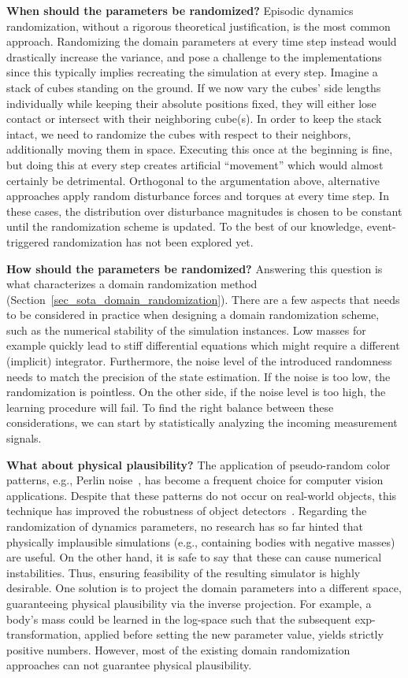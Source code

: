 \documentclass[utf8]{frontiersSCNS} %
\begin{document}
\textbf{When should the parameters be randomized?}
Episodic dynamics randomization, without a rigorous theoretical justification, is the most common approach.
Randomizing the domain parameters at every time step instead would drastically increase the variance, and pose a challenge to the implementations since this typically implies recreating the simulation at every step.
Imagine a stack of cubes standing on the ground.
If we now vary the cubes' side lengths individually while keeping their absolute positions fixed, they will either lose contact or intersect with their neighboring cube(s).
In order to keep the stack intact, we need to randomize the cubes with respect to their neighbors, additionally moving them in space.
Executing this once at the beginning is fine, but doing this at every step creates artificial \enquote{movement} which would almost certainly be detrimental.
Orthogonal to the argumentation above, alternative approaches apply random disturbance forces and torques at every time step.
In these cases, the distribution over disturbance magnitudes is chosen to be constant until the randomization scheme is updated. 
To the best of our knowledge, event-triggered randomization has not been explored yet.

\textbf{How should the parameters be randomized?}
Answering this question is what characterizes a domain randomization method (Section~\ref{sec_sota_domain_randomization}).
There are a few aspects that needs to be considered in practice when designing a domain randomization scheme, such as the numerical stability of the simulation instances.
Low masses for example quickly lead to stiff differential equations which might require a different (implicit) integrator.
Furthermore, the noise level of the introduced randomness needs to match the precision of the state estimation.
If the noise is too low, the randomization is pointless.
On the other side, if the noise level is too high, the learning procedure will fail.
To find the right balance between these considerations, we can start by statistically analyzing the incoming measurement signals.

\textbf{What about physical plausibility?}
The application of pseudo-random color patterns, e.g., Perlin noise~\citep{Perlin_02}, has become a frequent choice for computer vision applications.
Despite that these patterns do not occur on real-world objects, this technique has improved the robustness of object detectors~\citep{James_Johns_17,Pinto_Abbeel_17}.
Regarding the randomization of dynamics parameters, no research has so far hinted that physically implausible simulations (e.g., containing bodies with negative masses) are useful.
On the other hand, it is safe to say that these can cause numerical instabilities.
Thus, ensuring feasibility of the resulting simulator is highly desirable.
One solution is to project the domain parameters into a different space, guaranteeing physical plausibility via the inverse projection.
For example, a body's mass could be learned in the log-space such that the subsequent exp-transformation, applied before setting the new parameter value, yields strictly positive numbers.
However, most of the existing domain randomization approaches can not guarantee physical plausibility.
\end{document}
